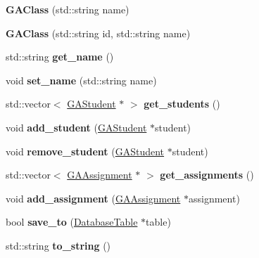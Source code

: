\begin{DoxyCompactItemize}
\item 
\mbox{\label{class_g_a_class_ab520f3410c2112a8a9dee4f1819ae46a}} 
{\bfseries G\+A\+Class} (std\+::string name)
\item 
\mbox{\label{class_g_a_class_a945aa950aa43a22d88e800eed2a99f2f}} 
{\bfseries G\+A\+Class} (std\+::string id, std\+::string name)
\item 
\mbox{\label{class_g_a_class_aa8f1809a862a8033cb2b483d5171766f}} 
std\+::string {\bfseries get\+\_\+name} ()
\item 
\mbox{\label{class_g_a_class_acdc31db88ea63107ebe71515adcb6d95}} 
void {\bfseries set\+\_\+name} (std\+::string name)
\item 
\mbox{\label{class_g_a_class_a121d237710301ee81cc112c40997dddb}} 
std\+::vector$<$ \hyperlink{class_g_a_student}{G\+A\+Student} $\ast$ $>$ {\bfseries get\+\_\+students} ()
\item 
\mbox{\label{class_g_a_class_a3ac2976fe89c09df2aa3169d18c03332}} 
void {\bfseries add\+\_\+student} (\hyperlink{class_g_a_student}{G\+A\+Student} $\ast$student)
\item 
\mbox{\label{class_g_a_class_acba6a56f7dd354fb2c503607d6160baf}} 
void {\bfseries remove\+\_\+student} (\hyperlink{class_g_a_student}{G\+A\+Student} $\ast$student)
\item 
\mbox{\label{class_g_a_class_a13ff8c6f399b1eb75b594398d39a28ff}} 
std\+::vector$<$ \hyperlink{class_g_a_assignment}{G\+A\+Assignment} $\ast$ $>$ {\bfseries get\+\_\+assignments} ()
\item 
\mbox{\label{class_g_a_class_a0e16dab0bd0e7fa2d226e2a3d9ee6454}} 
void {\bfseries add\+\_\+assignment} (\hyperlink{class_g_a_assignment}{G\+A\+Assignment} $\ast$assignment)
\item 
\mbox{\label{class_g_a_class_ad1dedccf3f22604d76a9d61f73e899fc}} 
bool {\bfseries save\+\_\+to} (\hyperlink{class_database_table}{Database\+Table} $\ast$table)
\item 
\mbox{\label{class_g_a_class_ac06d387b61bbafe7860e08f4b00148a4}} 
std\+::string {\bfseries to\+\_\+string} ()
\end{DoxyCompactItemize}
